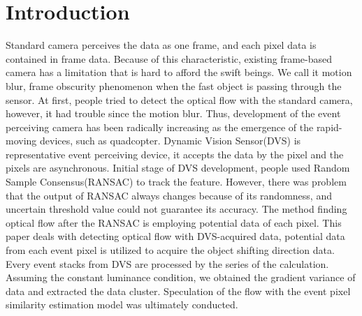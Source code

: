 \section{Introduction}
\label{sec:intro}
Standard camera perceives the data as one frame, and each pixel data is contained in frame data. Because of this characteristic, existing frame-based camera has a limitation that is hard to afford the swift beings. We call it motion blur, frame obscurity phenomenon when the fast object is passing through the sensor.
At first, people tried to detect the optical flow with the standard camera, however, it had trouble since the motion blur. Thus, development of the event perceiving camera has been radically increasing as the emergence of the rapid-moving devices, such as quadcopter. Dynamic Vision Sensor(DVS) is representative event perceiving device, it accepts the data by the pixel and the pixels are asynchronous. Initial stage of DVS development, people used Random Sample Consensus(RANSAC) to track the feature. However, there was problem that the output of RANSAC always changes because of its randomness, and uncertain threshold value could not guarantee its accuracy.
The method finding optical flow after the RANSAC is employing potential data of each pixel. This paper deals with detecting optical flow with DVS-acquired data, potential data from each event pixel is utilized to acquire the object shifting direction data. Every event stacks from DVS are processed by the series of the calculation. Assuming the constant luminance condition, we obtained the gradient variance of data and extracted the data cluster. Speculation of the flow with the event pixel similarity estimation model was ultimately conducted.

